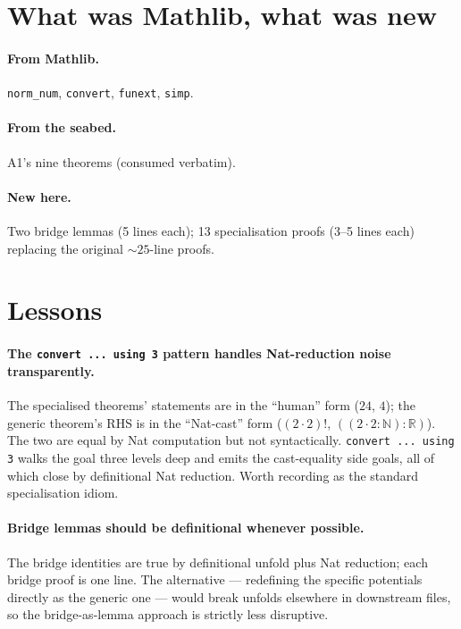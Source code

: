 \documentclass[11pt]{article}
\begin{document}
\section{What was Mathlib, what was new}

\paragraph{From Mathlib.} \texttt{norm\_num}, \texttt{convert},
\texttt{funext}, \texttt{simp}.

\paragraph{From the seabed.} A1's nine theorems (consumed verbatim).

\paragraph{New here.} Two bridge lemmas (5 lines each); 13
specialisation proofs (3--5 lines each) replacing the original
${\sim}25$-line proofs.

\section{Lessons}

\paragraph{The \texttt{convert ... using 3} pattern handles
Nat-reduction noise transparently.} The specialised theorems'
statements are in the ``human'' form ($24$, $4$); the generic
theorem's RHS is in the ``Nat-cast'' form ($(2 \cdot 2)!$,
$((2 \cdot 2 : \mathbb N) : \mathbb R)$). The two are equal by Nat
computation but not syntactically. \texttt{convert ... using 3} walks
the goal three levels deep and emits the cast-equality side goals,
all of which close by definitional Nat reduction. Worth recording as
the standard specialisation idiom.

\paragraph{Bridge lemmas should be definitional whenever possible.}
The bridge identities are true by definitional unfold plus Nat
reduction; each bridge proof is one line. The alternative ---
redefining the specific potentials directly as the generic one ---
would break unfolds elsewhere in downstream files, so the
bridge-as-lemma approach is strictly less disruptive.
\end{document}
